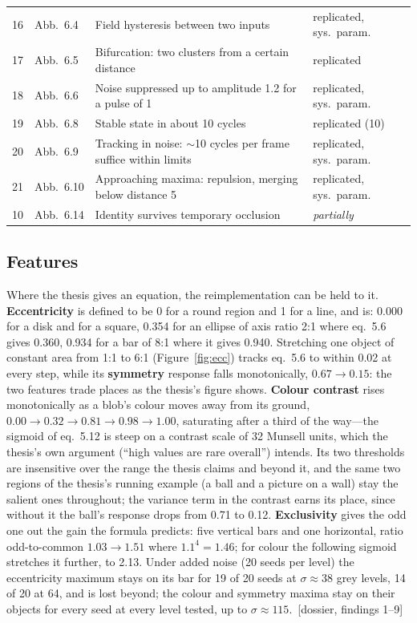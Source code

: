 \documentclass[11pt,a4paper]{article}
\newcommand{\src}[1]{\textcolor{blue!50!black}{\footnotesize\,[#1]}}
\newcommand{\src}[1]{}
\begin{document}
\begin{table}[t]
\begin{tabularx}{\linewidth}{@{}llXl@{}}
16 & Abb.~6.4  & Field hysteresis between two inputs & replicated, sys.\ param. \\
17 & Abb.~6.5  & Bifurcation: two clusters from a certain distance & replicated \\
18 & Abb.~6.6  & Noise suppressed up to amplitude 1.2 for a pulse of 1 & replicated, sys.\ param. \\
19 & Abb.~6.8  & Stable state in about 10 cycles & replicated (10) \\
20 & Abb.~6.9  & Tracking in noise: $\sim$10 cycles per frame suffice within limits & replicated, sys.\ param. \\
21 & Abb.~6.10 & Approaching maxima: repulsion, merging below distance 5 & replicated, sys.\ param. \\
10 & Abb.~6.14 & Identity survives temporary occlusion & \emph{partially} \\
\bottomrule
\end{tabularx}
\end{table}

\subsection{Features}
Where the thesis gives an equation, the reimplementation can be held to it.
\textbf{Eccentricity} is defined to be 0 for a round region and 1 for a line, and
is: 0.000 for a disk and for a square, 0.354 for an ellipse of axis ratio 2:1
where eq.~5.6 gives 0.360, 0.934 for a bar of 8:1 where it gives 0.940. Stretching
one object of constant area from 1:1 to 6:1 (Figure~\ref{fig:ecc}) tracks eq.~5.6
to within 0.02 at every step, while its \textbf{symmetry} response falls
monotonically, $0.67 \to 0.15$: the two features trade places as the thesis's
figure shows. \textbf{Colour contrast} rises monotonically as a blob's colour
moves away from its ground, $0.00 \to 0.32 \to 0.81 \to 0.98 \to 1.00$, saturating
after a third of the way---the sigmoid of eq.~5.12 is steep on a contrast scale
of 32 Munsell units, which the thesis's own argument (``high values are rare
overall'') intends. Its two thresholds are insensitive over the range the thesis
claims and beyond it, and the same two regions of the thesis's running example
(a ball and a picture on a wall) stay the salient ones throughout; the variance
term in the contrast earns its place, since without it the ball's response drops
from 0.71 to 0.12. \textbf{Exclusivity} gives the odd one out the gain the
formula predicts: five vertical bars and one horizontal, ratio odd-to-common
$1.03 \to 1.51$ where $1.1^4 = 1.46$; for colour the following sigmoid stretches
it further, to 2.13. Under added noise (20 seeds per level) the eccentricity
maximum stays on its bar for 19 of 20 seeds at $\sigma \approx 38$ grey levels,
14 of 20 at 64, and is lost beyond; the colour and symmetry maxima stay on their
objects for every seed at every level tested, up to $\sigma \approx 115$.
\src{dossier, findings 1--9}
\end{document}
